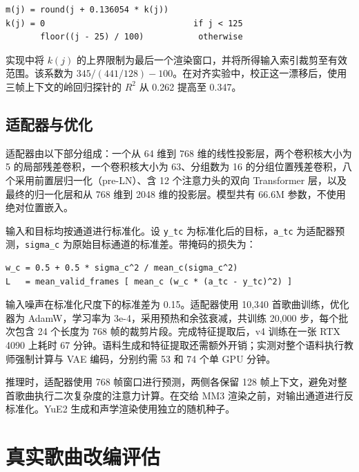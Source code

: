 \documentclass[11pt,a4paper,fontset=fandol]{ctexart}
\newcommand{\code}[1]{\texttt{#1}}
\begin{document}
\begin{Verbatim}[frame=single,fontsize=\small,samepage=true,xleftmargin=1em,xrightmargin=1em]
m(j) = round(j + 0.136054 * k(j))
k(j) = 0                              if j < 125
       floor((j - 25) / 100)           otherwise
\end{Verbatim}

实现中将 $k(j)$ 的上界限制为最后一个渲染窗口，并将所得输入索引裁剪至有效范围。该系数为 $345 / (441/128) - 100$。在对齐实验中，校正这一漂移后，使用三帧上下文的岭回归探针的 $R^2$ 从 0.262 提高至 0.347。

\subsection{适配器与优化}

适配器由以下部分组成：一个从 64 维到 768 维的线性投影层，两个卷积核大小为 5 的局部残差卷积，一个卷积核大小为 63、分组数为 16 的分组位置残差卷积，八个采用前置层归一化（pre-LN）、含 12 个注意力头的双向 Transformer 层，以及最终的归一化层和从 768 维到 2048 维的投影层。模型共有 66.6M 参数，不使用绝对位置嵌入。

输入和目标均按通道进行标准化。设 \code{y\_tc} 为标准化后的目标，\code{a\_tc} 为适配器预测，\code{sigma\_c} 为原始目标通道的标准差。带掩码的损失为：

\begin{Verbatim}[frame=single,fontsize=\small,samepage=true,xleftmargin=1em,xrightmargin=1em]
w_c = 0.5 + 0.5 * sigma_c^2 / mean_c(sigma_c^2)
L   = mean_valid_frames [ mean_c (w_c * (a_tc - y_tc)^2) ]
\end{Verbatim}

输入噪声在标准化尺度下的标准差为 0.15。适配器使用 10,340 首歌曲训练，优化器为 AdamW，学习率为 3e-4，采用预热和余弦衰减，共训练 20,000 步，每个批次包含 24 个长度为 768 帧的裁剪片段。完成特征提取后，v4 训练在一张 RTX 4090 上耗时 67 分钟。语料生成和特征提取还需额外开销；实测对整个语料执行教师强制计算与 VAE 编码，分别约需 53 和 74 个单 GPU 分钟。

推理时，适配器使用 768 帧窗口进行预测，两侧各保留 128 帧上下文，避免对整首歌曲执行二次复杂度的注意力计算。在交给 MM3 渲染之前，对输出通道进行反标准化。YuE2 生成和声学渲染使用独立的随机种子。

\section{真实歌曲改编评估}
\label{sec:eval}
\end{document}
